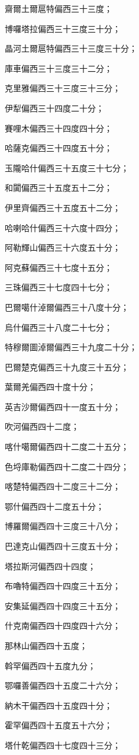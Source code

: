 \begin{pinyinscope}
齋爾土爾扈特偏西三十三度；

博囉塔拉偏西三十三度三十分；

晶河土爾扈特偏西三十三度三十分；

庫車偏西三十三度三十二分；

克里雅偏西三十三度三十三分；

伊犁偏西三十四度二十分；

賽哩木偏西三十四度四十分；

哈薩克偏西三十四度五十分；

玉隴哈什偏西三十五度三十七分；

和闐偏西三十五度五十二分；

伊里齊偏西三十五度五十二分；

哈喇哈什偏西三十六度十四分；

阿勒輝山偏西三十六度五十分；

阿克蘇偏西三十七度十五分；

三珠偏西三十七度四十七分；

巴爾噶什淖爾偏西三十八度十分；

烏什偏西三十八度二十七分；

特穆爾圖淖爾偏西三十九度二十分；

巴爾楚克偏西三十九度三十五分；

葉爾羌偏西四十度十分；

英吉沙爾偏西四十一度五十分；

吹河偏西四十二度；

喀什噶爾偏西四十二度二十五分；

色埒庫勒偏西四十二度二十四分；

喀楚特偏西四十二度三十二分；

鄂什偏西四十二度五十分；

博羅爾偏西四十三度三十八分；

巴達克山偏西四十三度五十分；

塔拉斯河偏西四十四度；

布嚕特偏西四十四度三十五分；

安集延偏西四十四度三十五分；

什克南偏西四十四度四十六分；

那林山偏西四十五度；

斡罕偏西四十五度九分；

鄂囉善偏西四十五度二十六分；

納木干偏西四十五度四十分；

霍罕偏西四十五度五十六分；

塔什乾偏西四十七度四十三分；


\end{pinyinscope}
